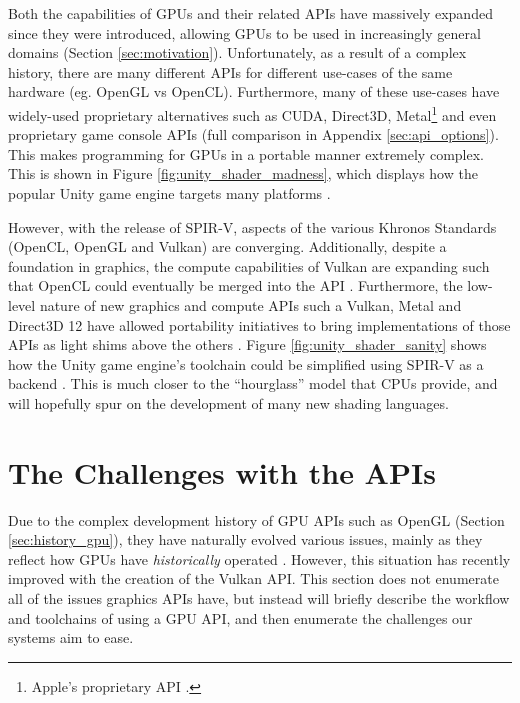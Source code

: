 \documentclass[a4paper,12pt,twoside,openright]{report}
\begin{document}
Both the capabilities of GPUs and their related APIs have massively expanded
since they were introduced, allowing GPUs to be used in increasingly general
domains (Section \ref{sec:motivation}). Unfortunately, as a result of a complex
history, there are many different APIs for different use-cases of the same
hardware (eg. OpenGL vs OpenCL). Furthermore, many of these use-cases have
widely-used proprietary alternatives such as CUDA, Direct3D,
Metal\footnote{Apple's proprietary API \cite{Metal}.} and even proprietary game
console APIs \cite{CUDA} \cite{Metal} \cite{Direct3D} \cite{PS4PortCrew} (full
comparison in Appendix \ref{sec:api_options}). This makes programming for GPUs
in a portable manner extremely complex. This is shown in Figure
\ref{fig:unity_shader_madness}, which displays how the popular Unity game
engine targets many platforms \cite{UnityShaderPipeline}.

However, with the release of SPIR-V, aspects of the various Khronos Standards
(OpenCL, OpenGL and Vulkan) are converging. Additionally, despite a foundation
in graphics, the compute capabilities of Vulkan are expanding such that OpenCL
could eventually be merged into the API \cite{VulkanOpenCLMerge}. Furthermore,
the low-level nature of new graphics and compute APIs such a Vulkan, Metal and
Direct3D 12 have allowed portability initiatives to bring implementations of
those APIs as light shims above the others \cite{VulkanPortabilityInitiative}
\cite{VulkanPortabilityInitiativeAnnouncement}. Figure
\ref{fig:unity_shader_sanity} shows how the Unity game engine's toolchain could
be simplified using SPIR-V as a backend \cite{UnityShaderPipeline}. This is
much closer to the ``hourglass'' model that CPUs provide, and will hopefully
spur on the development of many new shading languages.

\section{The Challenges with the APIs}

\label{sec:api_challanges}

Due to the complex development history of GPU APIs such as OpenGL (Section
\ref{sec:history_gpu}), they have naturally evolved various issues, mainly as
they reflect how GPUs have \textit{historically} operated
\cite{VulkanAnnouncement}. However, this situation has recently improved with
the creation of the Vulkan API. This section does not enumerate all of the
issues graphics APIs have, but instead will briefly describe the workflow and
toolchains of using a GPU API, and then enumerate the challenges our systems
aim to ease.
\end{document}
